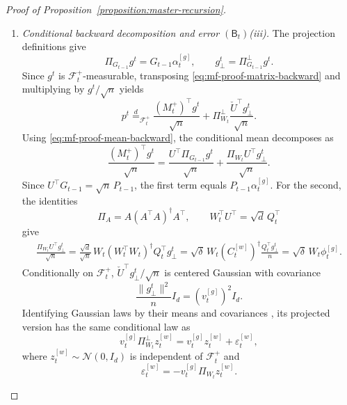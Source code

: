 \begin{proof}[Proof of Proposition~\ref{proposition:master-recursion}]
\begin{enumerate}[wide]
\begin{enumerate}[label=(\alph*),wide]
        \item \emph{Conditional backward decomposition and error
        $(\mathsf B_t)$\textup{(iii)}.}
        The projection definitions give
        \[
            \Pi_{G_{t-1}}g^t
            =
            G_{t-1}\alpha_t^{[g]},
            \qquad
            g_\perp^t
            =
            \Pi_{G_{t-1}}^\perp g^t.
        \]
        Since $g^t$ is $\mathcal F_t^+$-measurable,
        transposing \eqref{eq:mf-proof-matrix-backward}
        and multiplying by $g^t/\sqrt n$ yields
        \[
            p^t
            \stackrel d=_{\mathcal F_t^+}
            \frac{(M_t^+)^\top g^t}{\sqrt n}
            +
            \Pi_{W_t}^\perp
            \frac{\check U^\top g_\perp^t}{\sqrt n}.
        \]
        Using \eqref{eq:mf-proof-mean-backward},
        the conditional mean decomposes as
        \[
            \frac{(M_t^+)^\top g^t}{\sqrt n}
            =
            \frac{U^\top\Pi_{G_{t-1}}g^t}{\sqrt n}
            +
            \frac{\Pi_{W_t}U^\top g_\perp^t}{\sqrt n}.
        \]
        Since
        $U^\top G_{t-1}=\sqrt n\,P_{t-1}$,
        the first term equals
        $P_{t-1}\alpha_t^{[g]}$.
        For the second, the identities
        \[
            \Pi_A=A(A^\top A)^\dagger A^\top,
            \qquad
            W_t^\top U^\top=\sqrt d\,Q_t^\top
        \]
        give
        \[
        \begin{aligned}
            \frac{\Pi_{W_t}U^\top g_\perp^t}{\sqrt n}
            =
            \frac{\sqrt d}{\sqrt n}\,
            W_t(W_t^\top W_t)^\dagger
            Q_t^\top g_\perp^t
            =
            \sqrt\delta\,
            W_t(C_t^{[w]})^\dagger
            \frac{Q_t^\top g_\perp^t}{n}
            =
            \sqrt\delta\,W_t\phi_t^{[g]}.
        \end{aligned}
        \]
        Conditionally on $\mathcal F_t^+$,
        $\check U^\top g_\perp^t/\sqrt n$ is centered
        Gaussian with covariance
        \[
            \frac{\|g_\perp^t\|^2}{n}I_d
            =
            (v_t^{[g]})^2I_d.
        \]
        Identifying Gaussian laws by their means and
        covariances
        \cite[Lemma~14.1(i)]{kallenberg2021foundations},
        its projected version has the same conditional law as
        \[
            v_t^{[g]}\Pi_{W_t}^\perp z_t^{[w]}
            =
            v_t^{[g]}z_t^{[w]}+\varepsilon_t^{[w]},
        \]
        where $z_t^{[w]}\sim\mathcal N(0,I_d)$ is independent
        of $\mathcal F_t^+$ and
        \[
            \varepsilon_t^{[w]}
            =
            -v_t^{[g]}\Pi_{W_t}z_t^{[w]}.
\]
\end{enumerate}
\end{enumerate}
\end{proof}
